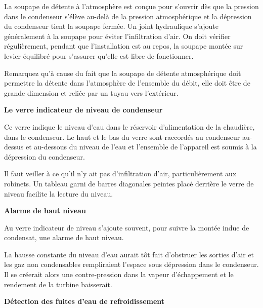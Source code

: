 La soupape de détente à l’atmosphère est conçue pour s’ouvrir dès que la pression dans le condenseur s’élève au-delà de la pression atmosphérique et la dépression du condenseur tient la soupape fermée. Un joint hydraulique s’ajoute généralement à la soupape pour éviter l’infiltration d’air. On doit vérifier régulièrement, pendant que l’installation est au repos, la soupape montée sur levier équilibré pour s’assurer qu’elle est libre de fonctionner.
\vspace{0.3cm}

Remarquez qu’à cause du fait que la soupape de détente atmosphérique doit permettre la détente dans l’atmosphère de l’ensemble du débit, elle doit être de grande dimension et reliée par un tuyau vers l’extérieur. 



\vspace{0.3cm}
\textbf{Le verre indicateur de niveau de condenseur}
\vspace{0.3cm}

Ce verre indique le niveau d’eau dans le réservoir d’alimentation de la chaudière, dans le condenseur. Le haut et le bas du verre sont raccordés au condenseur au-dessus et au-dessous du niveau de l’eau et l’ensemble de l’appareil est soumis à la dépression du condenseur.
\vspace{0.3cm}

Il faut veiller à ce qu’il n’y ait pas d’infiltration d’air, particulièrement aux robinets. Un tableau garni de barres diagonales peintes placé derrière le verre de niveau facilite la lecture du niveau.

\vspace{0.3cm}
\textbf{Alarme de haut niveau}
\vspace{0.3cm}

Au verre indicateur de niveau s’ajoute souvent, pour suivre la montée indue de condensat, une alarme de haut niveau.
\vspace{0.3cm}

La hausse constante du niveau d’eau aurait tôt fait d’obstruer les sorties d’air et les gaz non condensables rempliraient l’espace sous dépression dans le condenseur. Il se créerait alors une contre-pression dans la vapeur d’échappement et le rendement de la turbine baisserait.



\vspace{0.3cm}
\textbf{Détection des fuites d’eau de refroidissement}
\vspace{0.3cm}

